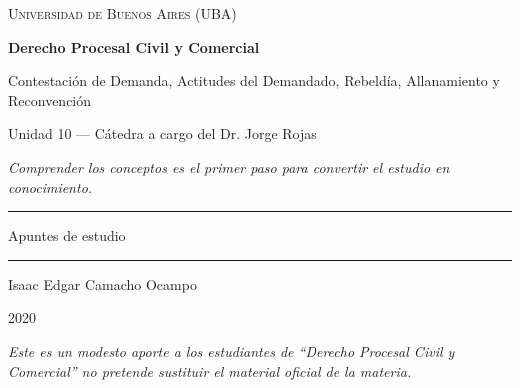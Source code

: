 \documentclass[12pt,oneside]{book}
\newcommand{\universidad}{Universidad de Buenos Aires (UBA)}
\newcommand{\materia}{Derecho Procesal Civil y Comercial}
\newcommand{\titulo}{Contestación de Demanda, Actitudes del Demandado, Rebeldía, Allanamiento y Reconvención}
\newcommand{\autor}{Isaac Edgar Camacho Ocampo}
\newcommand{\anio}{2020}
\begin{document}
\begin{titlepage}

\thispagestyle{empty}

\begin{center}

\vspace*{1.5cm}

{\large \textsc{\universidad}}

\vspace{3cm}

{\Huge \textbf{\materia}}

\vspace{1cm}

{\LARGE \titulo}

\vspace{0.6cm}

{\normalsize Unidad 10 — Cátedra a cargo del Dr. Jorge Rojas}

\vspace{0.8cm}

\textit{Comprender los conceptos es el primer paso para convertir el estudio en conocimiento.}

\vspace{1.2cm}

\rule{0.70\textwidth}{0.5pt}

\vspace{0.5cm}

{\large Apuntes de estudio}

\vspace{0.5cm}

\rule{0.70\textwidth}{0.5pt}

\vfill

{\large \autor}

\vspace{0.3cm}

{\large \anio}

\end{center}

\vfill

\begin{flushleft}
\textit{Este es un modesto aporte a los estudiantes de ``Derecho Procesal Civil y Comercial'' no pretende sustituir el material oficial de la materia.}
\end{flushleft}

\end{titlepage}

\tableofcontents
\end{document}
